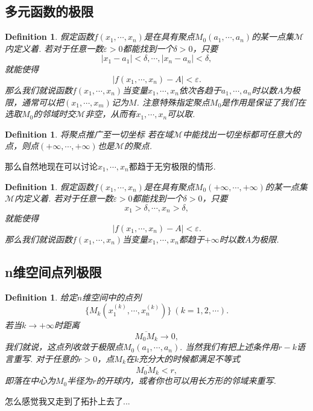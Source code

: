\documentclass{article}
\newtheorem{definition}[theorem]{Definition}
\begin{document}
\newpage
\subsection{多元函数的极限} 
\begin{definition}
\rm 假定函数$f(x_1,\cdots,x_n)$是在具有聚点$M_0(a_1,\cdots,a_n)$的某一点集$\mathcal{M}$内定义着. 若对于任意一数$\varepsilon > 0$都能找到一个$\delta > 0$，只要
$$
|x_1 - a_1| < \delta, \cdots , |x_n - a_n| < \delta,
$$
就能使得
$$
|f(x_1,\cdots,x_n) - A| < \varepsilon.
$$
那么我们就说函数$f(x_1,\cdots,x_n)$当变量$x_1, \cdots, x_n$依次各趋于$a_1, \cdots,a_n$时以数$A$为极限，通常可以把$(x_1,\cdots,x_m)$记为$M$. {\color{blue} 注意特殊指定聚点$M_0$是作用是保证了我们在选取$M_0$的邻域时交$\mathcal{M}$非空，从而有$x_1,\cdots,x_n$可以取}.
\end{definition}

\begin{definition}
\rm {\color{red} 将聚点推广至一切坐标} 若在域$\mathcal{M}$中能找出一切坐标都可任意大的点，则点$(+\infty,\cdots,+\infty)$也是$\mathcal{M}$的聚点.
\end{definition}

那么自然地现在可以讨论$x_1,\cdots,x_n$都趋于无穷极限的情形.

\begin{definition}
假定函数$f(x_1,\cdots,x_n)$是在具有聚点$M_0(+\infty,\cdots,+\infty)$的某一点集$\mathcal{M}$内定义着. 若对于任意一数$\varepsilon > 0$都能找到一个$\delta >0$，只要
$$
x_1 > \delta, \cdots, x_n > \delta,
$$
就能使得
$$
|f(x_1,\cdots,x_n) - A| < \varepsilon.
$$
那么我们就说函数$f(x_1,\cdots,x_n)$当变量$x_1,\cdots,x_n$都趋于$+\infty$时以数$A$为极限.
\end{definition}

\newpage
\subsection{n维空间点列极限}

\begin{definition}
\rm 给定$n$维空间中的点列
$$
\{M_k(x_1^{(k)},\cdots,x_n^{(k)})\}~(k = 1,2,\cdots).
$$
若当$k \rightarrow +\infty$时距离
$$
\overline{M_0M_k} \rightarrow 0,
$$
我们就说，这点列收敛于极限点$M_0(a_1,\cdots,a_n).$ 当然我们有把上述条件用$r-k$语言重写. 对于任意的$r>0$，点$M_k$在$k$充分大的时候都满足不等式
$$
\overline{M_0M_k} < r,
$$
即落在中心为$M_0$半径为$r$的开球内，或者你也可以用长方形的邻域来重写.
\end{definition}


{\color{blue} 怎么感觉我又走到了拓扑上去了}...
\end{document}
